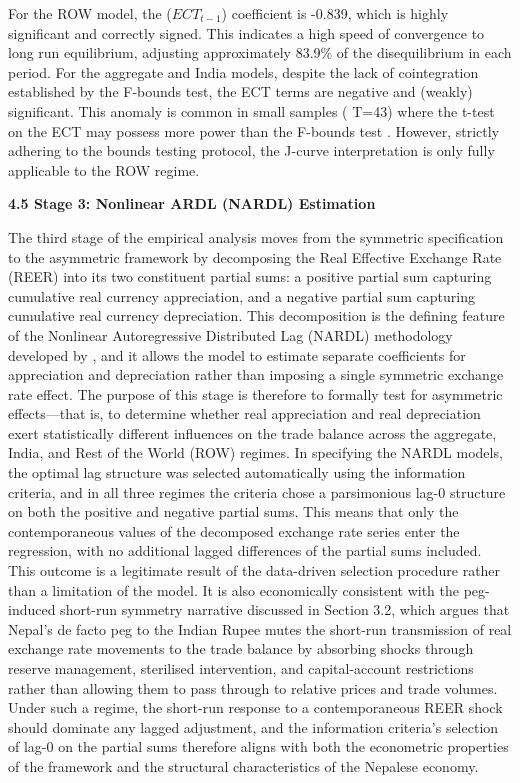 \documentclass[12pt]{article}
\begin{document}
For the ROW model, the ($ECT_{t-1}$) coefficient is -0.839, which is highly significant and correctly signed. This indicates a high speed of convergence to long run equilibrium, adjusting approximately 83.9\% of the disequilibrium in each period. For the aggregate and India models, despite the lack of cointegration established by the F-bounds test, the ECT terms are negative and (weakly) significant. This anomaly is common in small samples (
T=43) where the t-test on the ECT may possess more power than the F-bounds test \textcite{Kremers1992-yh}. However, strictly adhering to the bounds testing protocol, the J-curve interpretation is only fully applicable to the ROW regime.

\vspace{0.5cm}
\noindent\textbf{4.5 Stage 3: Nonlinear ARDL (NARDL) Estimation}

The third stage of the empirical analysis moves from the symmetric specification to the asymmetric framework by decomposing the Real Effective Exchange Rate (REER) into its two constituent partial sums: a positive partial sum capturing cumulative real currency appreciation, and a negative partial sum capturing cumulative real currency depreciation. This decomposition is the defining feature of the Nonlinear Autoregressive Distributed Lag (NARDL) methodology developed by \textcite{Shin2014-ap}, and it allows the model to estimate separate coefficients for appreciation and depreciation rather than imposing a single symmetric exchange rate effect. The purpose of this stage is therefore to formally test for asymmetric effects—that is, to determine whether real appreciation and real depreciation exert statistically different influences on the trade balance across the aggregate, India, and Rest of the World (ROW) regimes. In specifying the NARDL models, the optimal lag structure was selected automatically using the information criteria, and in all three regimes the criteria chose a parsimonious lag-0 structure on both the positive and negative partial sums. This means that only the contemporaneous values of the decomposed exchange rate series enter the regression, with no additional lagged differences of the partial sums included. This outcome is a legitimate result of the data-driven selection procedure rather than a limitation of the model. It is also economically consistent with the peg-induced short-run symmetry narrative discussed in Section 3.2, which argues that Nepal's de facto peg to the Indian Rupee mutes the short-run transmission of real exchange rate movements to the trade balance by absorbing shocks through reserve management, sterilised intervention, and capital-account restrictions rather than allowing them to pass through to relative prices and trade volumes. Under such a regime, the short-run response to a contemporaneous REER shock should dominate any lagged adjustment, and the information criteria's selection of lag-0 on the partial sums therefore aligns with both the econometric properties of the framework and the structural characteristics of the Nepalese economy.
\end{document}

